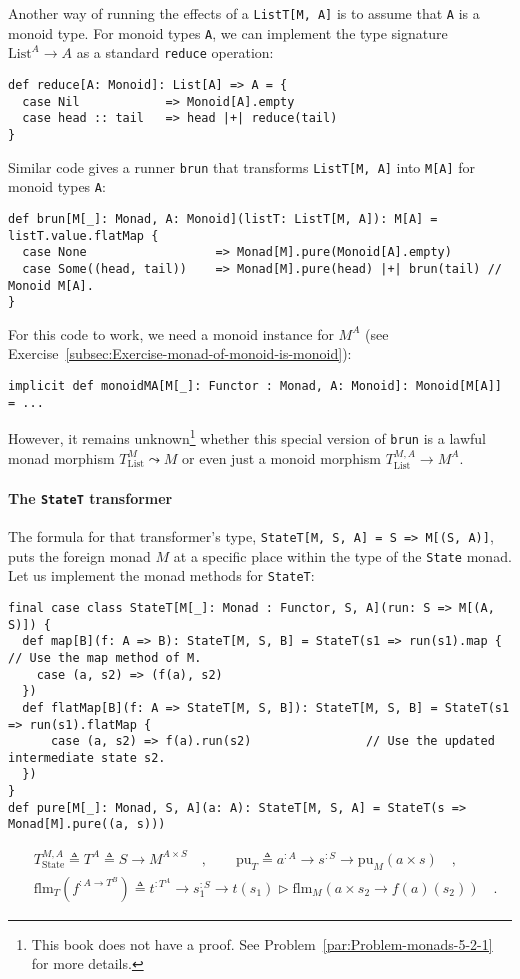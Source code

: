 Another way of running the effects of a \lstinline!ListT[M, A]! is
to assume that \lstinline!A! is a monoid type. For monoid types \lstinline!A!,
we can implement the type signature $\text{List}^{A}\rightarrow A$
as a standard \lstinline!reduce! operation:
\begin{lstlisting}
def reduce[A: Monoid]: List[A] => A = {
  case Nil            => Monoid[A].empty
  case head :: tail   => head |+| reduce(tail)
}
\end{lstlisting}
Similar code gives a runner \lstinline!brun! that transforms \lstinline!ListT[M, A]!
into \lstinline!M[A]! for monoid types \lstinline!A!:
\begin{lstlisting}
def brun[M[_]: Monad, A: Monoid](listT: ListT[M, A]): M[A] = listT.value.flatMap {
  case None                  => Monad[M].pure(Monoid[A].empty)
  case Some((head, tail))    => Monad[M].pure(head) |+| brun(tail) // Monoid M[A].
}
\end{lstlisting}
For this code to work, we need a monoid instance for $M^{A}$ (see
Exercise~\ref{subsec:Exercise-monad-of-monoid-is-monoid}):
\begin{lstlisting}
implicit def monoidMA[M[_]: Functor : Monad, A: Monoid]: Monoid[M[A]] = ...
\end{lstlisting}
However, it remains unknown\footnote{This book does not have a proof. See Problem~\ref{par:Problem-monads-5-2-1}
for more details.} whether this special version of \lstinline!brun! is a lawful monad
morphism $T_{\text{List}}^{M}\leadsto M$ or even just a monoid morphism
$T_{\text{List}}^{M,A}\rightarrow M^{A}$.

\paragraph{The \texttt{StateT} transformer}

The formula for that transformer\textsf{'}s type, \lstinline!StateT[M, S, A] = S => M[(S, A)]!,
puts the foreign monad $M$ at a specific place within the type of
the \lstinline!State! monad. Let us implement the monad methods for
\lstinline!StateT!:
\begin{lstlisting}
final case class StateT[M[_]: Monad : Functor, S, A](run: S => M[(A, S)]) {
  def map[B](f: A => B): StateT[M, S, B] = StateT(s1 => run(s1).map { // Use the map method of M.
    case (a, s2) => (f(a), s2)
  })
  def flatMap[B](f: A => StateT[M, S, B]): StateT[M, S, B] = StateT(s1 => run(s1).flatMap {
      case (a, s2) => f(a).run(s2)                // Use the updated intermediate state s2.
  })
}
def pure[M[_]: Monad, S, A](a: A): StateT[M, S, A] = StateT(s => Monad[M].pure((a, s)))
\end{lstlisting}
\begin{align}
 & T_{\text{State}}^{M,A}\triangleq T^{A}\triangleq S\rightarrow M^{A\times S}\quad,\quad\quad\text{pu}_{T}\triangleq a^{:A}\rightarrow s^{:S}\rightarrow\text{pu}_{M}(a\times s)\quad,\label{eq:pure-for-stateT-transformer}\\
 & \text{flm}_{T}(f^{:A\rightarrow T^{B}})\triangleq t^{:T^{A}}\rightarrow s_{1}^{:S}\rightarrow t(s_{1})\triangleright\text{flm}_{M}(a\times s_{2}\rightarrow f(a)(s_{2}))\quad.\label{eq:flatmap-for-stateT-transformer}
\end{align}


